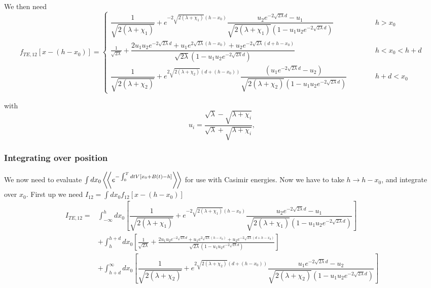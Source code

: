  We then need 
\begin{equation}
f_{TE,12}[x-(h-x_0)] = \left\{ \begin{array}{ccr}
\dfrac{1}{\sqrt{2(\lambda+\chi_1)}} + e^{-2\sqrt{2(\lambda+\chi_1)}(h-x_0)}\dfrac{u_2 e^{-2\sqrt{2\lambda}d} - u_1}{\sqrt{2(\lambda+\chi_1)}(1-u_1u_2 e^{-2\sqrt{2\lambda}d})} & \hspace{1cm} & h>x_0\\
\frac{1}{\sqrt{2\lambda}} + \dfrac{2u_1u_2 e^{-2\sqrt{2\lambda}d} + u_1 e^{2\sqrt{2\lambda}(h-x_0)} +u_2 e^{-2\sqrt{2\lambda}(d+h-x_0)}}{\sqrt{2\lambda}(1-u_1u_2 e^{-2\sqrt{2\lambda}d})} & \hspace{1cm} & h<x_0<h+d\\
  \dfrac{1}{\sqrt{2(\lambda+\chi_2)}} + e^{2\sqrt{2(\lambda+\chi_2)}(d+(h-x_0))}\dfrac{(u_1 e^{-2\sqrt{2\lambda}d}-u_2)}{\sqrt{2(\lambda+\chi_2)}(1-u_1u_2 e^{-2\sqrt{2\lambda}d})} & \hspace{1cm} & h+d<x_0
\end{array}
\right.
\end{equation}

with 
\begin{equation}
u_i = \frac{\sqrt{\lambda} -\sqrt{\lambda+\chi_i}}{\sqrt{\lambda} + \sqrt{\lambda+\chi_i}},
\end{equation}


\subsubsection{Integrating over position}
We now need to evaluate $\int dx_0 \left\langle\!\left\langle e^{-\int_0^T dt V[x_0 + B(t)-h]}\right\rangle\!\right\rangle$ for use with Casimir energies.   Now we have to take $h\rightarrow h-x_0$, and integrate over $x_0$. 
First up we need $I_{12}=\int dx_0 f_{12}[x-(h-x_0)]$
\begin{align}
I_{TE,12} %
=&\int_{-\infty}^h dx_0 \left[\dfrac{1}{\sqrt{2(\lambda+\chi_1)}} + e^{-2\sqrt{2(\lambda+\chi_1)}(h-x_0)}\dfrac{u_2 e^{-2\sqrt{2\lambda}d} - u_1}{\sqrt{2(\lambda+\chi_1)}(1-u_1u_2 e^{-2\sqrt{2\lambda}d})}\right] \nonumber\\
& +\int_{h}^{h+d}dx_0\left[\frac{1}{\sqrt{2\lambda}} + \frac{2u_1u_2 e^{-2\sqrt{2\lambda}d} + u_1 e^{2\sqrt{2\lambda}(h-x_0)} +u_2 e^{-2\sqrt{2\lambda}(d+h-x_0)}}{\sqrt{2\lambda}(1-u_1u_2 e^{-2\sqrt{2\lambda}d})} \right]\nonumber\\
&+ \int_{h+d}^\infty dx_0 \left[\dfrac{1}{\sqrt{2(\lambda+\chi_2)}} + e^{2\sqrt{2(\lambda+\chi_2)}(d+(h-x_0))}\dfrac{u_1 e^{-2\sqrt{2\lambda}d}-u_2}{\sqrt{2(\lambda+\chi_2)}(1-u_1u_2 e^{-2\sqrt{2\lambda}d})}\right]
\end{align}

